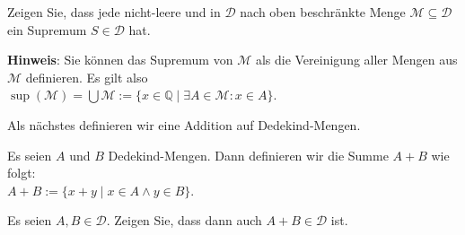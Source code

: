 \exercise
Zeigen Sie, dass jede nicht-leere und in $\mathcal{D}$ nach oben beschr\"ankte Menge
$\mathcal{M} \subseteq \mathcal{D}$ ein Supremum $S \in \mathcal{D}$ hat.  
\vspace*{0.2cm}

\noindent
\textbf{Hinweis}: Sie k\"onnen das Supremum von $\mathcal{M}$ als die Vereinigung aller Mengen aus
$\mathcal{M}$ definieren.  Es gilt also
\\[0.2cm]
\hspace*{1.3cm}
$\sup(\mathcal{M}) = \bigcup \mathcal{M} := \{ x \in \mathbb{Q} \mid \exists A \in \mathcal{M}: x \in A \}$.
\eox

\noindent
Als n\"achstes definieren wir eine Addition auf Dedekind-Mengen.


\begin{Definition} \hspace*{\fill} \linebreak
Es seien $A$ und $B$ Dedekind-Mengen.  Dann definieren wir die Summe $A + B$ wie folgt:
\\[0.2cm]
\hspace*{1.3cm}
$A + B := \{ x + y \mid x \in A \wedge y \in B \}$. \edx
\end{Definition}

\exercise
Es seien $A,B \in \mathcal{D}$.  Zeigen Sie, dass dann auch $A + B \in \mathcal{D}$ ist.
\eox


